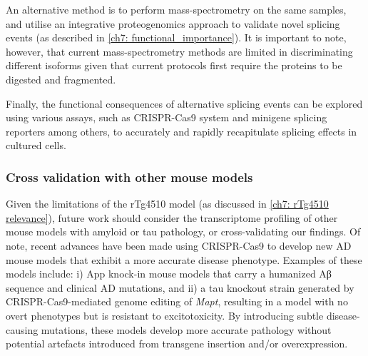 An alternative method is to perform mass-spectrometry on the same samples, and utilise an integrative proteogenomics approach to validate novel splicing events (as described in \cref{ch7: functional_importance}). It is important to note, however, that current mass-spectrometry methods are limited in discriminating different isoforms given that current protocols first require the proteins to be digested and fragmented. 

Finally, the functional consequences of alternative splicing events can be explored using various assays, such as CRISPR-Cas9 system and minigene splicing reporters among others, to accurately and rapidly recapitulate splicing effects in cultured cells.  


\subsubsection{Cross validation with other mouse models}  
\label{ch7: cross-validation_mouse_models}
Given the limitations of the rTg4510 model (as discussed in \cref{ch7: rTg4510 relevance}), future work should consider the transcriptome profiling of other mouse models with amyloid or tau pathology, or cross-validating our findings. Of note, recent advances have been made using CRISPR-Cas9 to develop new AD mouse models that exhibit a more accurate disease phenotype. Examples of these models include: i) App knock-in mouse models that carry a humanized Aβ sequence and clinical AD mutations\cite{Nagata2018, Serneels2020}, and ii) a tau knockout strain generated by CRISPR-Cas9-mediated genome editing of \textit{Mapt}, resulting in a model with no overt phenotypes but is resistant to excitotoxicity\cite{Tan2018}. By introducing subtle disease-causing mutations, these models develop more accurate pathology without potential artefacts introduced from transgene insertion and/or overexpression.


